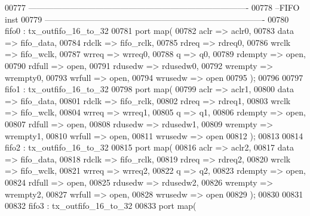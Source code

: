 \begin{DoxyCode}
00777 \textcolor{keyword}{ -------------------------------------------------------------------------------}
00778 \textcolor{keyword}{--FIFO inst}
00779 \textcolor{keyword}{-------------------------------------------------------------------------------        }
00780   fifo0 : tx_outfifo_16_to_32 
00781   \textcolor{keywordflow}{port} \textcolor{keywordflow}{map}(
00782         aclr           => aclr0,
00783         data           => fifo_data, 
00784         rdclk          => fifo_rclk,
00785         rdreq          => rdreq0,
00786         wrclk          => fifo_wclk, 
00787         wrreq          => wrreq0, 
00788         q             => q0, 
00789         rdempty     => \textcolor{keywordflow}{open},
00790         rdfull      => \textcolor{keywordflow}{open},
00791         rdusedw     => rdusedw0,
00792         wrempty     => wrempty0,
00793         wrfull      => \textcolor{keywordflow}{open}, 
00794         wrusedw     => \textcolor{keywordflow}{open}
00795   \textcolor{vhdlchar}{)};
00796   
00797     fifo1 : tx_outfifo_16_to_32 
00798   \textcolor{keywordflow}{port} \textcolor{keywordflow}{map}(
00799         aclr            => aclr1,
00800         data            => fifo_data, 
00801         rdclk          => fifo_rclk,
00802         rdreq          => rdreq1,
00803         wrclk          => fifo_wclk, 
00804         wrreq          => wrreq1, 
00805         q             => q1, 
00806         rdempty     => \textcolor{keywordflow}{open},
00807         rdfull      => \textcolor{keywordflow}{open},
00808         rdusedw     => rdusedw1,
00809         wrempty     => wrempty1,
00810         wrfull      => \textcolor{keywordflow}{open}, 
00811         wrusedw     => \textcolor{keywordflow}{open}
00812   \textcolor{vhdlchar}{)};
00813   
00814     fifo2 : tx_outfifo_16_to_32 
00815   \textcolor{keywordflow}{port} \textcolor{keywordflow}{map}(
00816         aclr            => aclr2,
00817         data            => fifo_data, 
00818         rdclk          => fifo_rclk,
00819         rdreq          => rdreq2,
00820         wrclk          => fifo_wclk, 
00821         wrreq          => wrreq2, 
00822         q             => q2, 
00823         rdempty     => \textcolor{keywordflow}{open},
00824         rdfull      => \textcolor{keywordflow}{open},
00825         rdusedw     => rdusedw2,
00826         wrempty     => wrempty2,
00827         wrfull      => \textcolor{keywordflow}{open}, 
00828         wrusedw     => \textcolor{keywordflow}{open}
00829   \textcolor{vhdlchar}{)};
00830   
00831    
00832       fifo3 : tx_outfifo_16_to_32 
00833   \textcolor{keywordflow}{port} \textcolor{keywordflow}{map}(

\end{DoxyCode}
